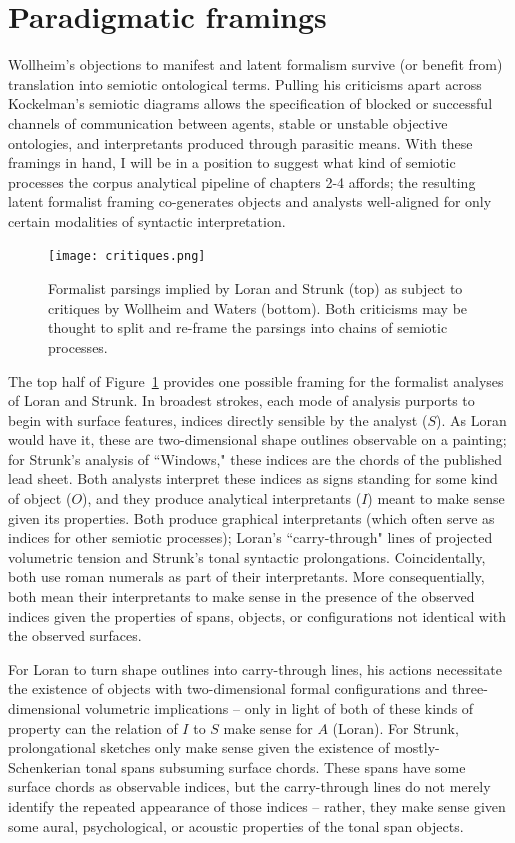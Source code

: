 \section{Paradigmatic framings}
Wollheim's objections to manifest and latent formalism survive (or benefit from) translation into semiotic ontological terms. Pulling his criticisms apart across Kockelman's semiotic diagrams allows the specification of blocked or successful channels of communication between agents, stable or unstable objective ontologies, and interpretants produced through parasitic means.  With these framings in hand, I will be in a position to suggest what kind of semiotic processes the corpus analytical pipeline of chapters 2-4 affords; the resulting latent formalist framing co-generates objects and analysts well-aligned for only certain modalities of syntactic interpretation.

\begin{figure}
	\centering
	\caption{Formalist parsings implied by Loran and Strunk (top) as subject to critiques by Wollheim and Waters (bottom).  Both criticisms may be thought to split and re-frame the parsings into chains of semiotic processes.}
	\label{critiques}
	\texttt{[image: critiques.png]}
\end{figure}

The top half of Figure~\ref{critiques} provides one possible framing for the formalist analyses of Loran and Strunk.  In broadest strokes, each mode of analysis purports to begin with surface features, indices directly sensible by the analyst ($S$).  As Loran would have it, these are two-dimensional shape outlines observable on a painting; for Strunk's analysis of ``Windows," these indices are the chords of the published lead sheet.  Both analysts interpret these indices as signs standing for some kind of object ($O$), and they produce analytical interpretants ($I$) meant to make sense given its properties.  Both produce graphical interpretants (which often serve as indices for other semiotic processes); Loran's ``carry-through" lines of projected volumetric tension and Strunk's tonal syntactic prolongations.  Coincidentally, both use roman numerals as part of their interpretants.  More consequentially, both mean their interpretants to make sense in the presence of the observed indices given the properties of spans, objects, or configurations not identical with the observed surfaces.

For Loran to turn shape outlines into carry-through lines, his actions necessitate the existence of objects with two-dimensional formal configurations and three-dimensional volumetric implications -- only in light of both of these kinds of property can the relation of $I$ to $S$ make sense for $A$ (Loran).  For Strunk, prolongational sketches only make sense given the existence of mostly-Schenkerian tonal spans subsuming surface chords.  These spans have some surface chords as observable indices, but the carry-through lines do not merely identify the repeated appearance of those indices -- rather, they make sense given some aural, psychological, or acoustic properties of the tonal span objects.

